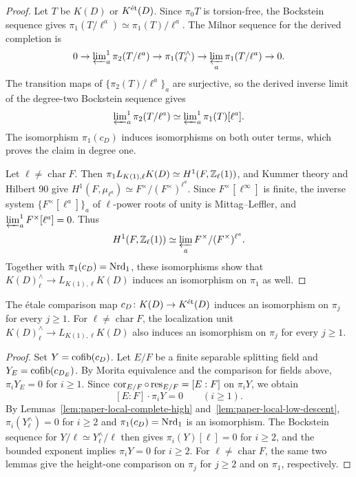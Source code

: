 \begin{proof}
Let $T$ be $K(D)$ or $K^{\mathrm{\acute et}}(D)$.
Since $\pi_0T$ is torsion-free, the Bockstein sequence gives $\pi_1(T/\ell^a)\simeq\pi_1(T)/\ell^a$.
The Milnor sequence for the derived completion is
\[
 0\to\varprojlim\nolimits^1_a\pi_2(T/\ell^a)
 \to\pi_1(T^\wedge_\ell)\to\varprojlim_a\pi_1(T/\ell^a)\to0.
\]
The transition maps of $\{\pi_2(T)/\ell^a\}_a$ are surjective, so the derived inverse limit of the degree-two Bockstein sequence gives
\[
 \varprojlim\nolimits^1_a\pi_2(T/\ell^a)\simeq\varprojlim\nolimits^1_a\pi_1(T)[\ell^a].
\]
The isomorphism $\pi_1(c_D)$ induces isomorphisms on both outer terms, which proves the claim in degree one.

Let $\ell\ne\operatorname{char}F$.
Then $\pi_1L_{K(1),\ell}K(D)\simeq H^1(F,\mathbb Z_\ell(1))$, and Kummer theory and Hilbert 90 give $H^1(F,\mu_{\ell^a})\simeq F^\times/(F^\times)^{\ell^a}$.
Since $F^\times[\ell^\infty]$ is finite, the inverse system $\{F^\times[\ell^a]\}_a$ of $\ell$-power roots of unity is Mittag--Leffler, and $\varprojlim^1_aF^\times[\ell^a]=0$.
Thus
\[
 H^1(F,\mathbb Z_\ell(1))\simeq\varprojlim_a F^\times/(F^\times)^{\ell^a}.
\]
Together with $\pi_1(c_D)=\operatorname{Nrd}_1$, these isomorphisms show that $K(D)^\wedge_\ell\to L_{K(1),\ell}K(D)$ induces an isomorphism on $\pi_1$ as well.
\end{proof}


\begin{lemma}\label{lem:paper-local-compare}
The \'etale comparison map $c_D\colon K(D)\to K^{\mathrm{\acute et}}(D)$ induces an isomorphism on $\pi_j$ for every $j\ge1$.
For $\ell\ne\operatorname{char}F$, the localization unit $K(D)^\wedge_\ell\to L_{K(1),\ell}K(D)$ also induces an isomorphism on $\pi_j$ for every $j\ge1$.
\end{lemma}
\begin{proof}
Set $Y=\operatorname{cofib}(c_D)$.
Let $E/F$ be a finite separable splitting field and $Y_E=\operatorname{cofib}(c_{D_E})$.
By Morita equivalence and the comparison for fields above, $\pi_iY_E=0$ for $i\ge1$.
Since $\operatorname{cor}_{E/F}\circ\operatorname{res}_{E/F}=[E:F]$ on $\pi_iY$, we obtain
\[
 [E:F]\cdot\pi_iY=0\qquad(i\ge1).
\]
By Lemmas~\ref{lem:paper-local-complete-high} and~\ref{lem:paper-local-low-descent}, $\pi_i(Y^\wedge_\ell)=0$ for $i\ge2$ and $\pi_1(c_D)=\operatorname{Nrd}_1$ is an isomorphism.
The Bockstein sequence for $Y/\ell\simeq Y^\wedge_\ell/\ell$ then gives $\pi_i(Y)[\ell]=0$ for $i\ge2$, and the bounded exponent implies $\pi_iY=0$ for $i\ge2$.
For $\ell\ne\operatorname{char}F$, the same two lemmas give the height-one comparison on $\pi_j$ for $j\ge2$ and on $\pi_1$, respectively.
\end{proof}

